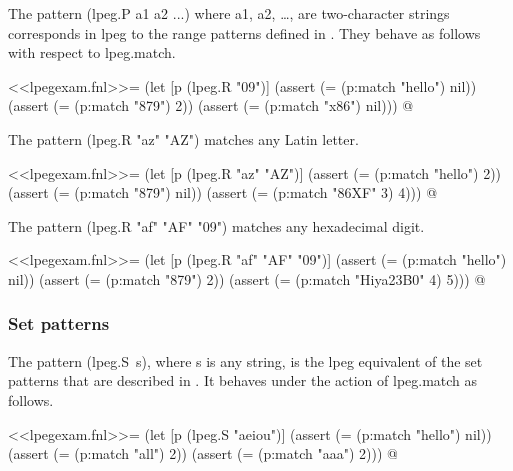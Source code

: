 \documentclass{article}
\begin{document}
The pattern \textsf{(lpeg.P a1 a2 ...)} where \textsf{a1},
\textsf{a2}, \dots, are two-character strings corresponds in
\textsf{lpeg} to the range patterns defined in .
They behave as follows with respect to \textsf{lpeg.match}.
\begin{codechunk}
<<lpegexam.fnl>>=
(let [p (lpeg.R "09")]
  (assert (= (p:match "hello") nil))
  (assert (= (p:match "879") 2))
  (assert (= (p:match "x86") nil)))
@
\end{codechunk}

The pattern \textsf{(lpeg.R "az" "AZ")} matches any Latin letter.
\begin{codechunk}
<<lpegexam.fnl>>=
(let [p (lpeg.R "az" "AZ")]
  (assert (= (p:match "hello") 2))
  (assert (= (p:match "879") nil))
  (assert (= (p:match "86XF" 3) 4)))
@
\end{codechunk}

The pattern \textsf{(lpeg.R "af" "AF" "09")} matches any hexadecimal
digit.
\begin{codechunk}
<<lpegexam.fnl>>=
(let [p (lpeg.R "af" "AF" "09")]
  (assert (= (p:match "hello") nil))
  (assert (= (p:match "879") 2))
  (assert (= (p:match "Hiya23B0" 4) 5)))
@
\end{codechunk}

\subsubsection{Set patterns}
\label{sec:sghktf56}

The pattern \textsf{(lpeg.S~s)}, where \textsf{s} is any string, is
the \textsf{lpeg} equivalent of the set patterns that are described in
.  It behaves under the action of
\textsf{lpeg.match} as follows.
\begin{codechunk}
<<lpegexam.fnl>>=
(let [p (lpeg.S "aeiou")]
  (assert (= (p:match "hello") nil))
  (assert (= (p:match "all") 2))
  (assert (= (p:match "aaa") 2)))
@
\end{codechunk}

\bibsection

\nowebchunkssection

\nowebindexsection
\end{document}

